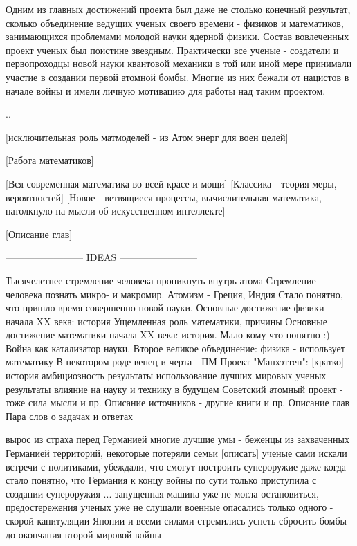 Одним из главных достижений проекта был даже не столько конечный результат, сколько объединение ведущих ученых своего времени -  физиков и математиков, занимающихся проблемами молодой науки ядерной физики. 
Состав вовлеченных проект ученых был поистине звездным.
Практически все ученые - создатели и первопроходцы новой науки квантовой механики в той или иной мере принимали участие в создании первой атомной бомбы.
Многие из них бежали от нацистов в начале войны и имели личную мотивацию для работы над таким проектом.


..

[исключительная роль матмоделей - из Атом энерг для воен целей]

[Работа математиков]

[Вся современная математика во всей красе и мощи]
[Классика - теория меры, вероятностей]
[Новое - ветвящиеся процессы, вычислительная математика, натолкнуло на мысли об искусственном интеллекте]

[Описание глав]



------------------------ IDEAS ------------------------ 

Тысячелетнее стремление человека проникнуть внутрь атома
Стремление человека познать микро- и макромир. Атомизм - Греция, Индия
Стало понятно, что пришло время совершенно новой науки.
Основные достижение физики начала XX века: история
Ущемленная роль математики, причины 
Основные достижение математики начала XX века: история. Мало кому что понятно :)
Война как катализатор науки.
Второе великое объединение: физика - использует математику
В некотором роде венец и черта - ПМ
Проект "Манхэттен": [кратко]
    история
    амбициозность
    результаты
    использование лучших мировых ученых
    результаты
    влияние на науку и технику в будущем
Советский атомный проект - тоже сила мысли и пр.
Описание источников - другие книги и пр.
Описание глав
Пара слов о задачах и ответах



вырос из страха перед Германией
многие лучшие умы - беженцы из захваченных Германией территорий, некоторые потеряли семьи [описать]
ученые сами искали встречи с политиками, убеждали, что смогут построить супероружие
даже когда стало понятно, что Германия к концу войны по сути только приступила с создании супероружия ...  запущенная машина уже не могла остановиться, предостережения ученых уже не слушали
военные опасались только  одного - скорой капитуляции Японии и всеми силами стремились успеть сбросить бомбы до окончания второй мировой войны

